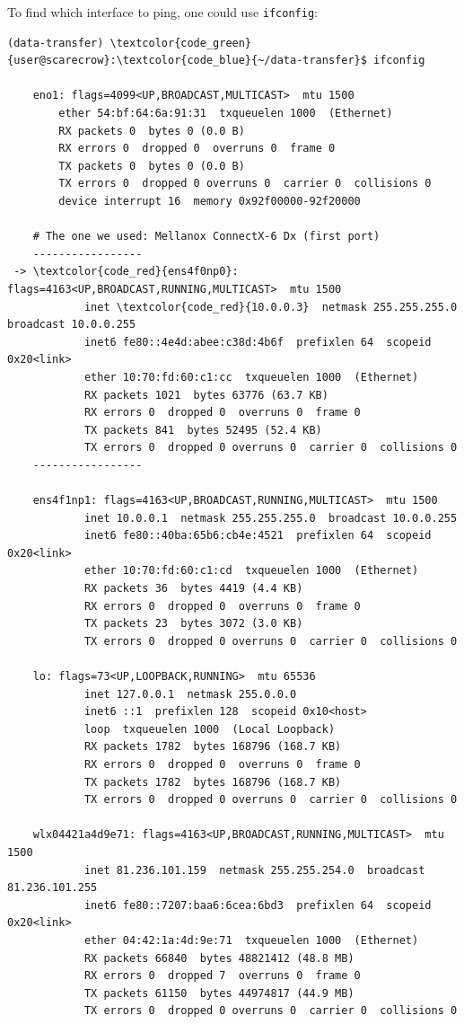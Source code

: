 \documentclass[a4paper,onecolumn]{article}
\begin{document}
\pagebreak
To find which interface to ping, one could use \verb|ifconfig|:

\begin{Verbatim}[commandchars=\\\{\}]
(data-transfer) \textcolor{code_green}{user@scarecrow}:\textcolor{code_blue}{~/data-transfer}$ ifconfig

    eno1: flags=4099<UP,BROADCAST,MULTICAST>  mtu 1500
        ether 54:bf:64:6a:91:31  txqueuelen 1000  (Ethernet)
        RX packets 0  bytes 0 (0.0 B)
        RX errors 0  dropped 0  overruns 0  frame 0
        TX packets 0  bytes 0 (0.0 B)
        TX errors 0  dropped 0 overruns 0  carrier 0  collisions 0
        device interrupt 16  memory 0x92f00000-92f20000  

    # The one we used: Mellanox ConnectX-6 Dx (first port)
    -----------------
 -> \textcolor{code_red}{ens4f0np0}: flags=4163<UP,BROADCAST,RUNNING,MULTICAST>  mtu 1500
            inet \textcolor{code_red}{10.0.0.3}  netmask 255.255.255.0  broadcast 10.0.0.255
            inet6 fe80::4e4d:abee:c38d:4b6f  prefixlen 64  scopeid 0x20<link>
            ether 10:70:fd:60:c1:cc  txqueuelen 1000  (Ethernet)
            RX packets 1021  bytes 63776 (63.7 KB)
            RX errors 0  dropped 0  overruns 0  frame 0
            TX packets 841  bytes 52495 (52.4 KB)
            TX errors 0  dropped 0 overruns 0  carrier 0  collisions 0
    -----------------

    ens4f1np1: flags=4163<UP,BROADCAST,RUNNING,MULTICAST>  mtu 1500
            inet 10.0.0.1  netmask 255.255.255.0  broadcast 10.0.0.255
            inet6 fe80::40ba:65b6:cb4e:4521  prefixlen 64  scopeid 0x20<link>
            ether 10:70:fd:60:c1:cd  txqueuelen 1000  (Ethernet)
            RX packets 36  bytes 4419 (4.4 KB)
            RX errors 0  dropped 0  overruns 0  frame 0
            TX packets 23  bytes 3072 (3.0 KB)
            TX errors 0  dropped 0 overruns 0  carrier 0  collisions 0

    lo: flags=73<UP,LOOPBACK,RUNNING>  mtu 65536
            inet 127.0.0.1  netmask 255.0.0.0
            inet6 ::1  prefixlen 128  scopeid 0x10<host>
            loop  txqueuelen 1000  (Local Loopback)
            RX packets 1782  bytes 168796 (168.7 KB)
            RX errors 0  dropped 0  overruns 0  frame 0
            TX packets 1782  bytes 168796 (168.7 KB)
            TX errors 0  dropped 0 overruns 0  carrier 0  collisions 0

    wlx04421a4d9e71: flags=4163<UP,BROADCAST,RUNNING,MULTICAST>  mtu 1500
            inet 81.236.101.159  netmask 255.255.254.0  broadcast 81.236.101.255
            inet6 fe80::7207:baa6:6cea:6bd3  prefixlen 64  scopeid 0x20<link>
            ether 04:42:1a:4d:9e:71  txqueuelen 1000  (Ethernet)
            RX packets 66840  bytes 48821412 (48.8 MB)
            RX errors 0  dropped 7  overruns 0  frame 0
            TX packets 61150  bytes 44974817 (44.9 MB)
            TX errors 0  dropped 0 overruns 0  carrier 0  collisions 0
\end{Verbatim}
\end{document}
